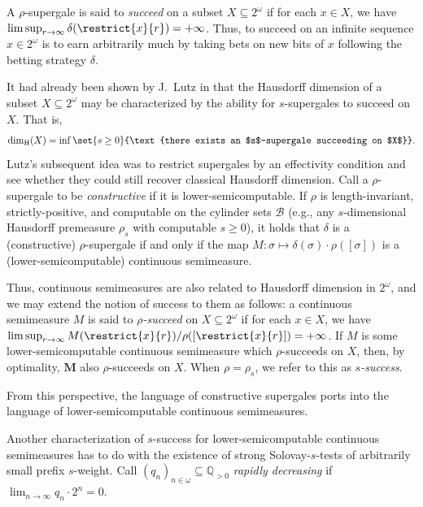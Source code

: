 A $\rho$-supergale is said to \textit{succeed} on a subset $X \subseteq 2^{\omega}$ if for each $x \in X$, we have $\limsup_{r \to \infty} \delta(\restrict{x}{r}) = + \infty$. Thus, to succeed on an infinite sequence $x \in 2^\omega$ is to earn arbitrarily much by taking bets on new bits of $x$ following the betting strategy $\delta$. 

It had already been shown by J.~Lutz in \cite{Lut2000} that the Hausdorff dimension of a subset $X \subseteq 2^\omega$ may be characterized by the ability for $s$-supergales to succeed on $X$. That is,
\begin{align}
    \label{equation:classical_relationship_supergales_and_Hausdorff_dimension}
    \dim_{\operatorname{H}}(X) = \inf \set{s \geq 0}{\text{there exists an $s$-supergale succeeding on $X$}}.
\end{align}
Lutz's subsequent idea was to restrict supergales by an effectivity condition and see whether they could still recover classical Hausdorff dimension. Call a $\rho$-supergale to be \textit{constructive} if it is lower-semicomputable. If $\rho$ is length-invariant, strictly-positive, and computable on the cylinder sets $\mathcal{B}$ (e.g., any $s$-dimensional Hausdorff premeasure $\rho_{s}$ with computable $s \geq 0$), it holds that $\delta$ is a (constructive) $\rho$-supergale if and only if the map $M : \sigma \mapsto \delta(\sigma) \cdot \rho([\sigma])$ is a (lower-semicomputable) continuous semimeasure. 

Thus, continuous semimeasures are also related to Hausdorff dimension in $2^\omega$, and we may extend the notion of success to them as follows: a continuous semimeasure $M$ is said to \textit{$\rho$-succeed} on $X \subseteq 2^\omega$ if for each $x \in X$, we have $\limsup_{r \to \infty} M(\restrict{x}{r}) / \rho([\restrict{x}{r}]) = +\infty$. If $M$ is some lower-semicomputable continuous semimeasure which $\rho$-succeeds on $X$, then, by optimality, $\mathbf{M}$ also $\rho$-succeeds on $X$. When $\rho = \rho_{s}$, we refer to this as \textit{$s$-success}. 

From this perspective, the language of constructive supergales ports into the language of lower-semicomputable continuous semimeasures. 

Another characterization of $s$-success for lower-semicomputable continuous semimeasures has to do with the existence of strong Solovay-$s$-tests of arbitrarily small prefix $s$-weight. Call $(q_n)_{n \in \omega} \subseteq \mathbb{Q}_{>0}$ \textit{rapidly decreasing} if $\lim_{n \to \infty} q_n \cdot 2^n = 0$.


